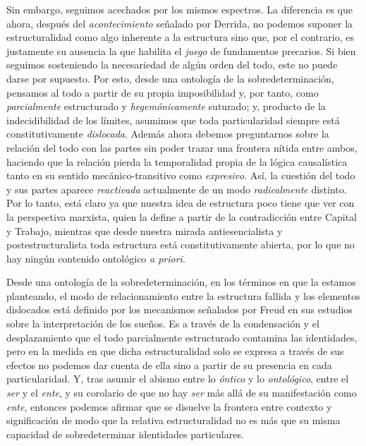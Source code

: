 Sin embargo, seguimos acechados por los mismos espectros. La diferencia es que ahora, después del \emph{acontecimiento} señalado por Derrida, no podemos suponer la estructuralidad como algo inherente a la estructura sino que, por el contrario, es justamente su ausencia la que habilita el \emph{juego} de fundamentos precarios. Si bien seguimos sosteniendo la necesariedad de algún orden del todo, este no puede darse por supuesto. Por esto, desde una ontología de la sobredeterminación, pensamos al todo a partir de su propia imposibilidad y, por tanto, como \emph{parcialmente} estructurado y \emph{hegemónicamente} suturado; y, producto de la indecidibilidad de los límites, asumimos que toda particularidad siempre está constitutivamente \emph{dislocada}. Además ahora debemos preguntarnos sobre la relación del todo con las partes sin poder trazar una frontera nítida entre ambos, haciendo que la relación pierda la temporalidad propia de la lógica causalística tanto en su sentido mecánico-transitivo como \emph{expresivo}. Así, la cuestión del todo y sus partes aparece \emph{reactivada} actualmente de un modo \emph{radicalmente} distinto. Por lo tanto, está claro ya que nuestra idea de estructura poco tiene que ver con la perspectiva marxista, quien la define a partir de la contradicción entre Capital y Trabajo, mientras que desde nuestra mirada antiesencialista y postestructuralista toda estructura está constitutivamente abierta, por lo que no hay ningún contenido ontológico \emph{a priori}.

Desde una ontología de la sobredeterminación, en los términos en que la estamos planteando, el modo de relacionamiento entre la estructura fallida y los elementos dislocados está definido por los mecanismos señalados por Freud en sus estudios sobre la interpretación de los sueños. Es a través de la condensación y el desplazamiento que el todo parcialmente estructurado contamina las identidades, pero en la medida en que dicha estructuralidad solo se expresa a través de sus efectos no podemos dar cuenta de ella sino a partir de su presencia en cada particularidad. Y, tras asumir el abismo entre lo \emph{óntico} y lo \emph{ontológico}, entre el \emph{ser} y el \emph{ente}, y su corolario de que no hay \emph{ser} más allá de su manifestación como \emph{ente}, entonces podemos afirmar que se disuelve la frontera entre contexto y significación de modo que la relativa estructuralidad no es más que su misma capacidad de sobredeterminar identidades particulares.

